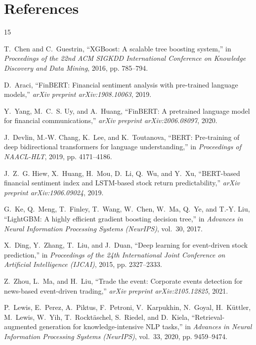 \documentclass{article}
\begin{document}
	\section{References}
	\begin{thebibliography}{15}

	T.~Chen and C.~Guestrin, ``XGBoost: A scalable tree boosting system,'' in \textit{Proceedings of the 22nd ACM SIGKDD International Conference on Knowledge Discovery and Data Mining}, 2016, pp. 785--794.

	D.~Araci, ``FinBERT: Financial sentiment analysis with pre-trained language models,'' \textit{arXiv preprint arXiv:1908.10063}, 2019.

	Y.~Yang, M.~C.~S. Uy, and A.~Huang, ``FinBERT: A pretrained language model for financial communications,'' \textit{arXiv preprint arXiv:2006.08097}, 2020.

	J.~Devlin, M.-W. Chang, K.~Lee, and K.~Toutanova, ``BERT: Pre-training of deep bidirectional transformers for language understanding,'' in \textit{Proceedings of NAACL-HLT}, 2019, pp. 4171--4186.

	J.~Z.~G. Hiew, X.~Huang, H.~Mou, D.~Li, Q.~Wu, and Y.~Xu, ``BERT-based financial sentiment index and LSTM-based stock return predictability,'' \textit{arXiv preprint arXiv:1906.09024}, 2019.

	G.~Ke, Q.~Meng, T.~Finley, T.~Wang, W.~Chen, W.~Ma, Q.~Ye, and T.-Y. Liu, ``LightGBM: A highly efficient gradient boosting decision tree,'' in \textit{Advances in Neural Information Processing Systems (NeurIPS)}, vol.~30, 2017.

	X.~Ding, Y.~Zhang, T.~Liu, and J.~Duan, ``Deep learning for event-driven stock prediction,'' in \textit{Proceedings of the 24th International Joint Conference on Artificial Intelligence (IJCAI)}, 2015, pp. 2327--2333.

	Z.~Zhou, L.~Ma, and H.~Liu, ``Trade the event: Corporate events detection for news-based event-driven trading,'' \textit{arXiv preprint arXiv:2105.12825}, 2021.

	P.~Lewis, E.~Perez, A.~Piktus, F.~Petroni, V.~Karpukhin, N.~Goyal, H.~Küttler, M.~Lewis, W.~Yih, T.~Rocktäschel, S.~Riedel, and D.~Kiela, ``Retrieval-augmented generation for knowledge-intensive NLP tasks,'' in \textit{Advances in Neural Information Processing Systems (NeurIPS)}, vol.~33, 2020, pp. 9459--9474.


\end{thebibliography}
\end{document}
